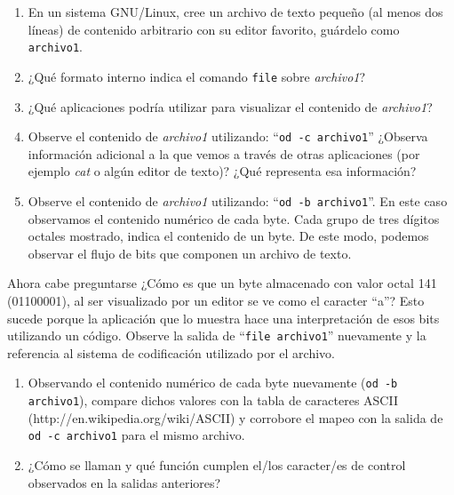 \documentclass[12pt]{article}
\begin{document}
\begin{enumerate}

    \item En un sistema GNU/Linux, cree un archivo de texto pequeño (al menos
        dos líneas) de contenido arbitrario con su editor favorito, guárdelo
        como {\tt archivo1}.

    \item ¿Qué formato interno indica el comando {\tt file} sobre
        \emph{archivo1}?

    \item ¿Qué aplicaciones podría utilizar para visualizar el contenido de
        \emph{archivo1}?

    \item Observe el contenido de \emph{archivo1} utilizando: ``{\tt od -c
        archivo1}'' ¿Observa información adicional a la que vemos a través de
        otras aplicaciones (por ejemplo \emph{cat} o algún editor de texto)?
        ¿Qué representa esa información?

    \item Observe el contenido de \emph{archivo1} utilizando: ``{\tt od -b
        archivo1}''. En este caso observamos el contenido numérico de cada
        byte. Cada grupo de tres dígitos octales mostrado, indica el contenido
        de un byte. De este modo, podemos observar el flujo de bits que
        componen un archivo de texto.

\end{enumerate}

Ahora cabe preguntarse ¿Cómo es que un byte almacenado con valor octal 141
(01100001), al ser visualizado por un editor se ve como el caracter ``a''?
Esto sucede porque la aplicación que lo muestra hace una interpretación de
esos bits utilizando un código. Observe la salida de ``{\tt file archivo1}''
nuevamente y la referencia al sistema de codificación utilizado por el
archivo. 

\begin{enumerate}[resume]

    \item Observando el contenido numérico de cada byte nuevamente ({\tt od -b
    archivo1}), compare dichos valores con la tabla de caracteres ASCII
    (http://en.wikipedia.org/wiki/ASCII) y corrobore el mapeo con la salida de
    {\tt od -c archivo1}  para el mismo archivo.

    \item ¿Cómo se llaman y qué función cumplen el/los caracter/es de control
    observados en la salidas anteriores?

\end{enumerate}
\end{document}
